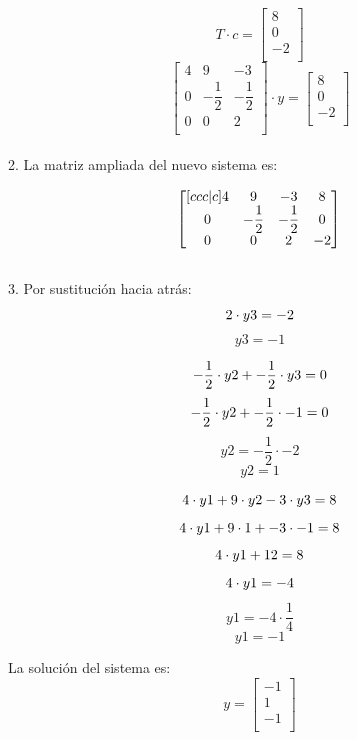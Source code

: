 \documentclass{article}
\begin{document}
\[
    T \cdot c = 
    \begin{bmatrix}
    8 \\
    0 \\
    -2 \\
    \end{bmatrix}
\] 
\[
\begin{bmatrix}
4 & 9 & -3 \\
0 & -\dfrac{1}{2} & -\dfrac{1}{2} \\
0 & 0 & 2 \\
\end{bmatrix}
\cdot y =
\begin{bmatrix}
8 \\
0 \\
-2 \\
\end{bmatrix}
\]\\

2. La matriz ampliada del nuevo sistema es:

\[ 
\begin{bmatrix}[ccc|c]
  4 & 9 & -3 & 8\\
  0 & -\dfrac{1}{2} & -\dfrac{1}{2} & 0\\
  0 & 0 & 2 & -2
\end{bmatrix}\\
\]\\

3. Por sustitución hacia atrás:
\[
2 \cdot y3 = -2 \\
\]
\[
y3=-1
\]

\[
-\dfrac{1}{2} \cdot y2 + -\dfrac{1}{2} \cdot y3 = 0 \\
\]
\[
-\dfrac{1}{2} \cdot y2 + -\dfrac{1}{2} \cdot -1 = 0 \\
\]
\[
y2 = -\dfrac{1}{2} \cdot -2
\]
\[
y2 = 1
\]

\[
4 \cdot y1 + 9 \cdot y2 - 3 \cdot y3 = 8 \\
\]
\[
4 \cdot y1 + 9 \cdot 1 + - 3 \cdot -1 = 8 \\
\]
\[
4 \cdot y1 + 12 = 8 \\
\]
\[
4 \cdot y1 = -4 \\
\]
\[
y1 = -4 \cdot \dfrac{1}{4}
\]
\[
y1 = -1
\]

La solución del sistema es:
\[
    y =
    \begin{bmatrix}
    -1 \\
    1 \\
    -1 \\
    \end{bmatrix}
\]\\
\end{document}
